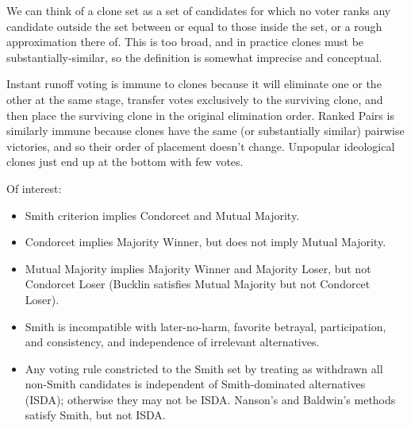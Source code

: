 We can think of a clone set as a set of candidates for which no voter ranks any candidate outside the set between or equal to those inside the set, or a rough approximation there of.  This is too broad, and in practice clones must be substantially-similar, so the definition is somewhat imprecise and conceptual.

Instant runoff voting is immune to clones because it will eliminate one or the other at the same stage, transfer votes exclusively to the surviving clone, and then place the surviving clone in the original elimination order.  Ranked Pairs is similarly immune because clones have the same (or substantially similar) pairwise victories, and so their order of placement doesn't change.  Unpopular ideological clones just end up at the bottom with few votes.

Of interest:

\begin{itemize}
    \item Smith criterion implies Condorcet and Mutual Majority.

    \item Condorcet implies Majority Winner, but does not imply Mutual Majority.

    \item Mutual Majority implies Majority Winner and Majority Loser, but not Condorcet Loser (Bucklin satisfies Mutual Majority but not Condorcet Loser).

    \item Smith is incompatible with later-no-harm, favorite betrayal, participation, and consistency, and independence of irrelevant alternatives.

    \item Any voting rule constricted to the Smith set by treating as withdrawn all non-Smith candidates is independent of Smith-dominated alternatives (ISDA); otherwise they may not be ISDA.  Nanson's and Baldwin's methods satisfy Smith, but not ISDA.
\end{itemize}

